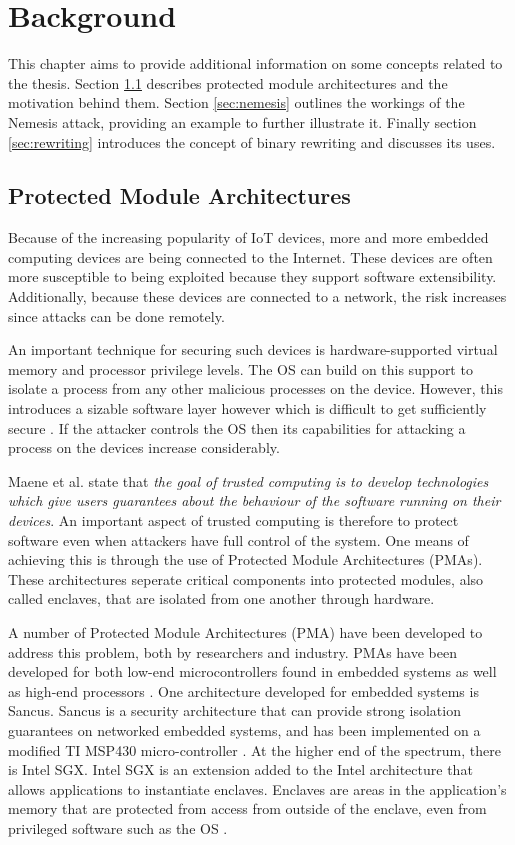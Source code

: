 \chapter{Background}
\label{cha:background}
This chapter aims to provide additional information on some concepts related to the thesis. 
Section \ref{sec:pma} describes protected module architectures and the motivation behind them. 
Section \ref{sec:nemesis} outlines the workings of the Nemesis attack, providing an example to further illustrate it. 
Finally section \ref{sec:rewriting} introduces the concept of binary rewriting and discusses its uses. 
\section{Protected Module Architectures}
\label{sec:pma}
Because of the increasing popularity of IoT devices, more and more embedded computing devices are being connected to the Internet. 
These devices are often more susceptible to being exploited because they support software extensibility. 
Additionally, because these devices are connected to a network, the risk increases since attacks can be done remotely. 

An important technique for securing such devices is hardware-supported virtual memory and processor privilege levels.
The OS can build on this support to isolate a process from any other malicious processes on the device. 
However, this introduces a sizable software layer however which is difficult to get sufficiently secure \cite{psma}.
If the attacker controls the OS then its capabilities for attacking a process on the devices increase considerably. 

Maene et al. \cite{trusted-computing-architectures} state that \textit{the goal of trusted computing is to develop technologies which give users guarantees about the behaviour of the software running on their devices}.
An important aspect of trusted computing is therefore to protect software even when attackers have full control of the system. 
One means of achieving this is through the use of Protected Module Architectures (PMAs). 
These architectures seperate critical components into protected modules, also called enclaves,
that are isolated from one another through hardware.  

A number of Protected Module Architectures (PMA) have been developed to address this problem, both by researchers and industry. 
PMAs have been developed for both low-end microcontrollers found in embedded systems \cite{trustlite, smart} as well as high-end processors \cite{isox}.
One architecture developed for embedded systems is Sancus. 
Sancus is a security architecture that can provide strong isolation guarantees on networked embedded systems, 
and has been implemented on a modified TI MSP430 micro-controller \cite{sancus}. 
At the higher end of the spectrum, there is Intel SGX.
Intel SGX is an extension  added to the Intel architecture that allows applications to instantiate enclaves. 
Enclaves are areas in the application's memory that are protected from access from outside of the enclave, even from 
privileged software such as the OS \cite{SGX}. 

